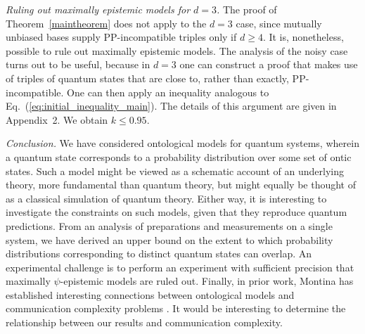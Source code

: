 \textit{Ruling out maximally epistemic models for $d=3$.}
The proof of Theorem~\ref{maintheorem} does not apply to the $d=3$ case, since mutually unbiased bases supply PP-incompatible triples only if $d\ge4$. It is, nonetheless, possible to rule out maximally epistemic models. The analysis of the noisy case turns out to be useful, because in $d=3$ one can construct a proof that makes use of triples of quantum states that are close to, rather than exactly, PP-incompatible. One can then apply an inequality analogous to Eq.~(\ref{eq:initial_inequality_main}). The details of this argument are given in Appendix~2. We obtain $k \leq 0.95$.

\textit{Conclusion.} We have considered ontological models for quantum systems, wherein a quantum state corresponds to a probability distribution over some set of ontic states. Such a model might be viewed as a schematic account of an underlying theory, more fundamental than quantum theory, but might equally be thought of as a classical simulation of quantum theory. Either way, it is interesting to investigate the constraints on such models, given that they reproduce quantum predictions. From an analysis of preparations and measurements on a single system, we have derived an upper bound on the extent to which probability distributions corresponding to distinct quantum states can overlap. An experimental challenge is to perform an experiment with sufficient precision that maximally $\psi$-epistemic models are ruled out. Finally, in prior work, Montina has established interesting connections between ontological models and communication complexity problems \cite{Montina2012}. It would be interesting to determine the relationship between our results and communication complexity.  
